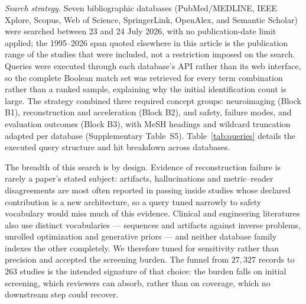 \documentclass[review,authoryear]{elsarticle}
\begin{document}
\emph{Search strategy.} Seven bibliographic databases (PubMed/MEDLINE, IEEE Xplore,
Scopus, Web of Science, SpringerLink, OpenAlex, and Semantic Scholar) were searched
between 23 and 24 July 2026, with no publication-date limit applied; the 1995--2026 span
quoted elsewhere in this article is the publication range of the studies that were
included, not a restriction imposed on the search. Queries were
executed through each database's API rather than its web interface, so the complete
Boolean match set was retrieved for every term combination rather than a ranked sample,
explaining why the initial identification count is large. The strategy combined three required
concept groups: neuroimaging (Block B1), reconstruction and acceleration (Block B2), and
safety, failure modes, and evaluation outcomes (Block B3), with MeSH headings and wildcard
truncation adapted per database (Supplementary Table~S5). Table~\ref{tab:queries} details the executed query structure and hit breakdown across databases.

The breadth of this search is by design. Evidence of reconstruction failure is rarely a
paper's stated subject: artifacts, hallucinations and metric--reader disagreements are most
often reported in passing inside studies whose declared contribution is a new architecture,
so a query tuned narrowly to safety vocabulary would miss much of this evidence. Clinical
and engineering literatures also use distinct vocabularies --- sequences and artifacts
against inverse problems, unrolled optimization and generative priors --- and neither
database family indexes the other completely. We therefore tuned for sensitivity rather
than precision and accepted the screening burden. The funnel from $27{,}327$ records to
$263$ studies is the intended signature of that choice: the burden falls on initial
screening, which reviewers can absorb, rather than on coverage, which no downstream step
could recover.
\end{document}
